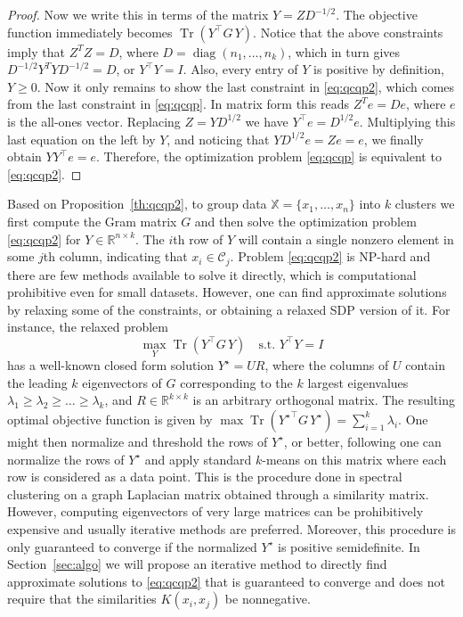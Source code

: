 \documentclass[aps,preprint,nofootinbib,floatfix]{revtex4-1}
\DeclareMathOperator{\diag}{diag}
\DeclareMathOperator{\Tr}{Tr}
\newcommand\kk{K}
\newcommand\C{{\mathcal{C}}}
\newcommand\Zt{Y}
\newcommand\e{e}
\begin{document}
\begin{proof}
Now we write this in terms of the matrix $Y = Z D^{-1/2}$.
The objective function immediately becomes
$\Tr\left( Y^\top G \, Y\right)$. Notice that the above constraints
imply that $Z^T Z = D$, where $D=\diag(n_1,\dotsc,n_k)$, which in turn gives
$D^{-1/2} Y^T Y D^{-1/2} = D$, or $Y^\top Y = I$. 
Also, every entry of $Y$ is positive by definition,
$Y \ge 0$. Now it only remains to show the last 
constraint in \eqref{eq:qcqp2}, which comes from the last
constraint in \eqref{eq:qcqp}. In matrix form this reads
$Z^T \e = D \e$, where $e$ is the all-ones vector. 
Replacing $Z=YD^{1/2}$ we have
$Y^\top \e = D^{1/2} \e$. Multiplying this last equation
on the left by $Y$, and noticing
that $Y D^{1/2} \e = Z \e = \e$, we finally obtain
$Y Y^\top \e = \e$. Therefore, the optimization 
problem \eqref{eq:qcqp} is equivalent
to \eqref{eq:qcqp2}.
\end{proof}

Based on Proposition~\ref{th:qcqp2}, to group data
$\mathbb{X} = \{ x_1,\dotsc,x_n \}$
into  $k$ clusters we first compute the Gram matrix
$G$ and then 
solve the optimization problem \eqref{eq:qcqp2} for $\Zt \in
\mathbb{R}^{n\times k}$. The $i$th row
of $\Zt$ will contain a single nonzero element in some $j$th column,
indicating that $x_i \in \C_j$. 
Problem \eqref{eq:qcqp2} is NP-hard and there
are few methods
available to solve it directly,
which is computational prohibitive even for small datasets.
However, one can find approximate solutions by relaxing some 
of the constraints, or obtaining a relaxed SDP version of it.
For instance, the relaxed problem
\begin{equation}
\max_{Y} \Tr \left( Y^\top G \, Y \right) \quad \mbox{s.t. $Y^\top Y = I$}
\end{equation}
has a well-known closed form solution $Y^\star = U R$, where the
columns of $U$ contain the leading $k$ eigenvectors of $G$ corresponding
to the $k$ largest eigenvalues $\lambda_1\ge \lambda_2\ge\dotsc\ge\lambda_k$, 
and
$R \in \mathbb{R}^{k\times k}$ is an arbitrary orthogonal matrix. 
The resulting
optimal objective function is given by
$\max \Tr \left( {Y^\star}^\top G \, Y^\star \right)  = 
\sum_{i=1}^k \lambda_i$. One might then normalize and threshold the rows
of $Y^\star$, or better, following \cite{NgJordan} one can normalize the
rows of $Y^\star$ and apply standard $k$-means on this matrix where each
row is considered as a data point.
This is the procedure done in spectral clustering on a graph Laplacian
matrix obtained through a similarity matrix.
However, computing eigenvectors of very large matrices
can be prohibitively expensive 
and usually iterative methods are preferred. Moreover,
this procedure is only guaranteed to converge if the normalized $Y^\star$ is
positive semidefinite.
In Section~\ref{sec:algo} we will propose an iterative method to directly 
find approximate solutions to \eqref{eq:qcqp2} that is guaranteed to
converge and does not require that the similarities $\kk(x_i,x_j)$ be
nonnegative.
\end{document}
